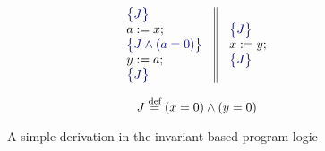 \begin{figure}[t]
\centering
\small
\begin{minipage}{0.55\columnwidth}
 \[
\begin{array}{c}
\begin{array}{c||c}
 \begin{array}{l}
\asrt{J } \\
a:=x; \\
\asrt{J \land (a=0)} \\
y:=a; \\
\asrt{J} 
 \end{array}&
 \begin{array}{l}
\asrt{J } \\
x:=y;  \\
\asrt{J } 
 \end{array}
 \end{array}
 \end{array}
 \]
 \end{minipage}
\begin{minipage}{0.40\columnwidth}
$$ J \stackrel{\text{def}}{=} \left( x=0\right) \land \left(y=0\right)$$ 
 \end{minipage}
\caption{A simple derivation in the invariant-based program logic}
\label{fig:logic}
\end{figure}


%
%
%
%
%
%
%




